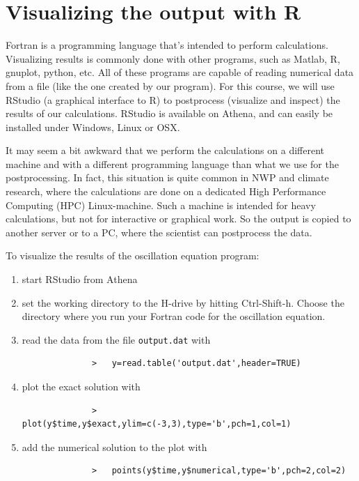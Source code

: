 \documentclass[a4paper]{article}
\begin{document}
\section{Visualizing the output with R}
%
\par
Fortran is a programming language that's intended to perform calculations. Visualizing results is commonly done with other programs, such as Matlab, R, gnuplot, python, etc. All of these programs are capable of reading numerical data from a file (like the one created by our program). For this course, we will use RStudio (a graphical interface to R) to postprocess (visualize and inspect) the results of our calculations. RStudio is available on Athena, and can easily be installed under Windows, Linux or OSX.
%
\par
It may seem a bit awkward that we perform the calculations on a different machine and with a different programming language than what we use for the postprocessing. In fact, this situation is quite common in NWP and climate research, where the calculations are done on a dedicated High Performance Computing (HPC) Linux-machine. Such a machine is intended for heavy calculations, but not for interactive or graphical work. So the output is copied to another server or to a PC, where the scientist can postprocess the data.
%
\par
To visualize the results of the oscillation equation program:
%
\begin{enumerate}
	\item start RStudio from Athena
	\item set the working directory to the H-drive by hitting Ctrl-Shift-h. Choose the directory where you run your Fortran code for the oscillation equation.
	\item read the data from the file \verb+output.dat+ with
		\begin{verbatim}
			  >   y=read.table('output.dat',header=TRUE)
		\end{verbatim}
	\item plot the exact solution with
		\begin{verbatim}
			  >   plot(y$time,y$exact,ylim=c(-3,3),type='b',pch=1,col=1)
		\end{verbatim}
	\item add the numerical solution to the plot with
		\begin{verbatim}
			  >   points(y$time,y$numerical,type='b',pch=2,col=2)
		\end{verbatim}
\end{enumerate}
\end{document}
